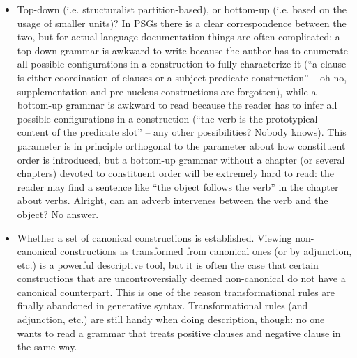 \documentclass{article}
\begin{document}
\begin{itemize}
    \item Top-down (i.e. structuralist partition-based), 
    or bottom-up (i.e. based on the usage of smaller units)? 
    In PSGs there is a clear correspondence between the two, 
    but for actual language documentation things are often complicated:
    a top-down grammar is awkward to write 
    because the author has to enumerate all possible configurations in a construction 
    to fully characterize it
    (``a clause is either coordination of clauses or a subject-predicate construction''
    -- oh no, supplementation and pre-nucleus constructions are forgotten),
    while a bottom-up grammar is awkward to read 
    because the reader has to infer all possible configurations in a construction 
    (``the verb is the prototypical content of the predicate slot''
    -- any other possibilities? Nobody knows).
    This parameter is in principle orthogonal to the parameter about how constituent order is introduced,
    but a bottom-up grammar without a chapter (or several chapters) devoted to constituent order 
    will be extremely hard to read:
    the reader may find a sentence like ``the object follows the verb'' in the chapter about verbs.
    Alright, can an adverb intervenes between the verb and the object? No answer.

    \item Whether a set of canonical constructions is established.
    Viewing non-canonical constructions as transformed from canonical ones (or by adjunction, etc.) 
    is a powerful descriptive tool,
    but it is often the case that certain constructions 
    that are uncontroversially deemed non-canonical do not have a canonical counterpart.
    This is one of the reason transformational rules are finally abandoned in generative syntax.
    Transformational rules (and adjunction, etc.) are still handy when doing description, though:
    no one wants to read a grammar that treats positive clauses and negative clause in the same way.


\end{itemize}
\end{document}
